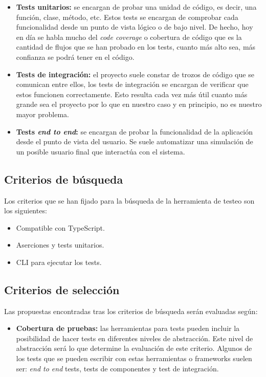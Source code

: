 \begin{itemize}
    \item \textbf{Tests unitarios:} se encargan de probar una unidad de código, es decir, una función, clase, método, etc. Estos tests se encargan de comprobar cada funcionalidad desde un punto de vista lógico o de bajo nivel. De hecho, hoy en día se habla mucho del \textit{code coverage} o cobertura de código que es la cantidad de flujos que se han probado en los tests, cuanto más alto sea, más confianza se podrá tener en el código.
    \item \textbf{Tests de integración:} el proyecto suele constar de trozos de código que se comunican entre ellos, los tests de integración se encargan de verificar que estos funcionen correctamente. Esto resulta cada vez más útil cuanto más grande sea el proyecto por lo que en nuestro caso y en principio, no es nuestro mayor problema.
    \item \textbf{Tests \textit{end to end}:} se encargan de probar la funcionalidad de la aplicación desde el punto de vista del usuario. Se suele automatizar una simulación de un posible usuario final que interactúa con el sistema.
\end{itemize}

\subsection{Criterios de búsqueda}

Los criterios que se han fijado para la búsqueda de la herramienta de testeo son los siguientes:

\begin{itemize}
    \item Compatible con TypeScript.
    \item Aserciones y tests unitarios.
    \item CLI para ejecutar los tests.
\end{itemize}

\subsection{Criterios de selección}

Las propuestas encontradas tras los criterios de búsqueda serán evaluadas según:

\begin{itemize}
    \item \textbf{Cobertura de pruebas:} las herramientas para tests pueden incluir la posibilidad de hacer tests en diferentes niveles de abstracción. Este nivel de abstracción será lo que determine la evaluación de este criterio. Algunos de los tests que se pueden escribir con estas herramientas o frameworks suelen ser: \textit{end to end} tests, tests de componentes y test de integración.
\end{itemize}

